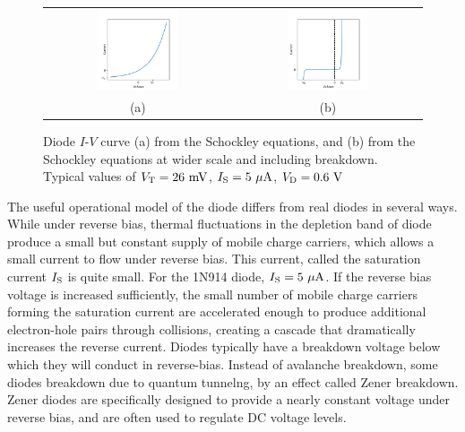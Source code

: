 \begin{figure}[htbp]
\begin{center}
\begin{tabular}{cc}
\includegraphics[width=0.45\textwidth]{figs/diodeeq.pdf} &
\includegraphics[width=0.45\textwidth]{figs/breakdown.pdf} \\
(a) &
(b) \\
\end{tabular}
\caption{Diode $I$-$V$ curve (a) from the Schockley equations, and (b) from the Schockley equations at wider scale and including breakdown.  Typical values of $V_{\rm T} = 26~\rm mV$, $I_{\rm S} = 5~\rm \mu A$, $V_{\rm D}=0.6~\rm V$}
\label{fig:diodeeqs}
\end{center}
\end{figure}

The useful operational model of the diode differs from real diodes in several ways.  While under reverse bias, thermal fluctuations in the depletion band of diode produce a small but constant supply of mobile charge carriers, which allows a small current to flow under reverse bias.  This current, called the saturation current $I_{\rm S}$ is quite small.  For the 1N914 diode, $I_{\rm S} = 5~\rm \mu A$.
If the reverse bias voltage is increased sufficiently, the small number of mobile charge carriers forming the saturation current are accelerated enough to produce additional electron-hole pairs through collisions, creating a cascade that dramatically increases the reverse current.   Diodes typically have a breakdown voltage below which they will conduct in reverse-bias.  Instead of avalanche breakdown, some diodes breakdown due to quantum tunnelng, by an effect called Zener breakdown.  Zener diodes are specifically designed to provide a nearly constant voltage under reverse bias, and are often used to regulate DC voltage levels.

